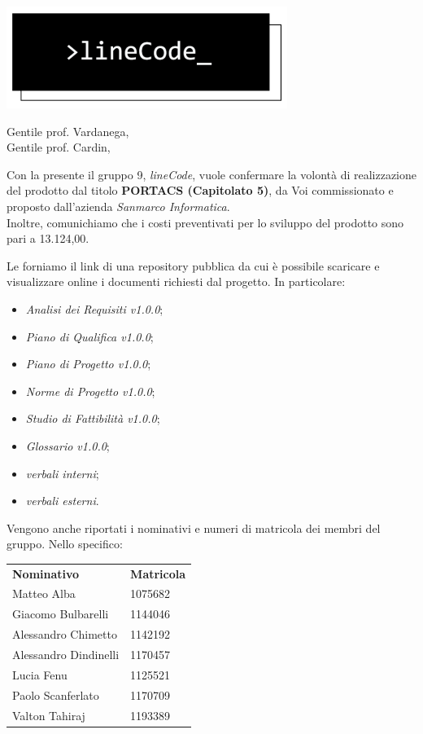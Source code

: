 \documentclass[12pt]{letter}
\date{10 gennaio 2021}
\begin{document}
\begin{letter}{ }

\includegraphics[scale=0.5]{../../commons/res/lclong.png}

\opening{Gentile prof. Vardanega,\\ Gentile prof. Cardin, }

Con la presente il gruppo 9, \textit{lineCode}, vuole confermare la volontà di realizzazione del prodotto dal titolo 
\textbf{PORTACS (Capitolato 5)}, da Voi commissionato e proposto dall'azienda \textit{Sanmarco Informatica}. \\
Inoltre, comunichiamo che i costi preventivati per lo sviluppo del prodotto sono pari a \EUR{}13.124,00.


Le forniamo il link di una repository pubblica da cui è possibile scaricare e visualizzare online i documenti richiesti dal progetto.
In particolare:

\begin{itemize}
	\item \textit{Analisi dei Requisiti v1.0.0};
	\item \textit{Piano di Qualifica v1.0.0};
	\item \textit{Piano di Progetto v1.0.0};
	\item \textit{Norme di Progetto v1.0.0};
	\item \textit{Studio di Fattibilità v1.0.0};
	\item \textit{Glossario v1.0.0};
	\item \textit{verbali interni};
	\item \textit{verbali esterni}.
\end{itemize}

\newpage

Vengono anche riportati i nominativi e numeri di matricola dei membri del gruppo. Nello specifico:

\begin{center}
   \centering
   \begin{tabular}{ll}
     \textbf{Nominativo}        & \textbf{Matricola} \\
     Matteo Alba                     &  1075682 \\
	 Giacomo Bulbarelli              &  1144046 \\
	 Alessandro Chimetto             &  1142192 \\     
	 Alessandro Dindinelli           &  1170457 \\	     
	 Lucia Fenu                      &  1125521 \\
     Paolo Scanferlato               &  1170709 \\
     Valton Tahiraj                  &  1193389 \\
   \end{tabular}
 \end{center}


\end{letter}
\end{document}
